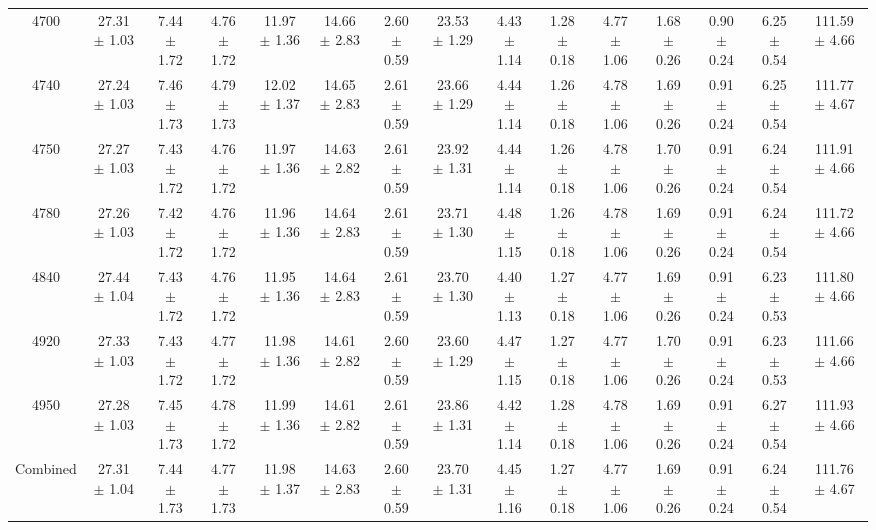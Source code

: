 \begin{table}[H]
{\begin{tabular}{ccccccccccccccc}
        4700 & 27.31 $\pm$ 1.03 & 7.44 $\pm$ 1.72 & 4.76 $\pm$ 1.72 & 11.97 $\pm$ 1.36 & 14.66 $\pm$ 2.83 & 2.60 $\pm$ 0.59 & 23.53 $\pm$ 1.29 & 4.43 $\pm$ 1.14 & 1.28 $\pm$ 0.18 & 4.77 $\pm$ 1.06 & 1.68 $\pm$ 0.26 & 0.90 $\pm$ 0.24 & 6.25 $\pm$ 0.54 & 111.59 $\pm$ 4.66 \\
        4740 & 27.24 $\pm$ 1.03 & 7.46 $\pm$ 1.73 & 4.79 $\pm$ 1.73 & 12.02 $\pm$ 1.37 & 14.65 $\pm$ 2.83 & 2.61 $\pm$ 0.59 & 23.66 $\pm$ 1.29 & 4.44 $\pm$ 1.14 & 1.26 $\pm$ 0.18 & 4.78 $\pm$ 1.06 & 1.69 $\pm$ 0.26 & 0.91 $\pm$ 0.24 & 6.25 $\pm$ 0.54 & 111.77 $\pm$ 4.67 \\
        4750 & 27.27 $\pm$ 1.03 & 7.43 $\pm$ 1.72 & 4.76 $\pm$ 1.72 & 11.97 $\pm$ 1.36 & 14.63 $\pm$ 2.82 & 2.61 $\pm$ 0.59 & 23.92 $\pm$ 1.31 & 4.44 $\pm$ 1.14 & 1.26 $\pm$ 0.18 & 4.78 $\pm$ 1.06 & 1.70 $\pm$ 0.26 & 0.91 $\pm$ 0.24 & 6.24 $\pm$ 0.54 & 111.91 $\pm$ 4.66 \\
        4780 & 27.26 $\pm$ 1.03 & 7.42 $\pm$ 1.72 & 4.76 $\pm$ 1.72 & 11.96 $\pm$ 1.36 & 14.64 $\pm$ 2.83 & 2.61 $\pm$ 0.59 & 23.71 $\pm$ 1.30 & 4.48 $\pm$ 1.15 & 1.26 $\pm$ 0.18 & 4.78 $\pm$ 1.06 & 1.69 $\pm$ 0.26 & 0.91 $\pm$ 0.24 & 6.24 $\pm$ 0.54 & 111.72 $\pm$ 4.66 \\
        4840 & 27.44 $\pm$ 1.04 & 7.43 $\pm$ 1.72 & 4.76 $\pm$ 1.72 & 11.95 $\pm$ 1.36 & 14.64 $\pm$ 2.83 & 2.61 $\pm$ 0.59 & 23.70 $\pm$ 1.30 & 4.40 $\pm$ 1.13 & 1.27 $\pm$ 0.18 & 4.77 $\pm$ 1.06 & 1.69 $\pm$ 0.26 & 0.91 $\pm$ 0.24 & 6.23 $\pm$ 0.53 & 111.80 $\pm$ 4.66 \\
        4920 & 27.33 $\pm$ 1.03 & 7.43 $\pm$ 1.72 & 4.77 $\pm$ 1.72 & 11.98 $\pm$ 1.36 & 14.61 $\pm$ 2.82 & 2.60 $\pm$ 0.59 & 23.60 $\pm$ 1.29 & 4.47 $\pm$ 1.15 & 1.27 $\pm$ 0.18 & 4.77 $\pm$ 1.06 & 1.70 $\pm$ 0.26 & 0.91 $\pm$ 0.24 & 6.23 $\pm$ 0.53 & 111.66 $\pm$ 4.66 \\
        4950 & 27.28 $\pm$ 1.03 & 7.45 $\pm$ 1.73 & 4.78 $\pm$ 1.72 & 11.99 $\pm$ 1.36 & 14.61 $\pm$ 2.82 & 2.61 $\pm$ 0.59 & 23.86 $\pm$ 1.31 & 4.42 $\pm$ 1.14 & 1.28 $\pm$ 0.18 & 4.78 $\pm$ 1.06 & 1.69 $\pm$ 0.26 & 0.91 $\pm$ 0.24 & 6.27 $\pm$ 0.54 & 111.93 $\pm$ 4.66 \\
        Combined  & 27.31 $\pm$ 1.04 & 7.44 $\pm$ 1.73 & 4.77 $\pm$ 1.73 & 11.98 $\pm$ 1.37 & 14.63 $\pm$ 2.83 & 2.60 $\pm$ 0.59 & 23.70 $\pm$ 1.31 & 4.45 $\pm$ 1.16 & 1.27 $\pm$ 0.18 & 4.77 $\pm$ 1.06 & 1.69 $\pm$ 0.26 & 0.91 $\pm$ 0.24 & 6.24 $\pm$ 0.54 & 111.76 $\pm$ 4.67\\
       
    \hline\hline
    \end{tabular}}
\end{table}

